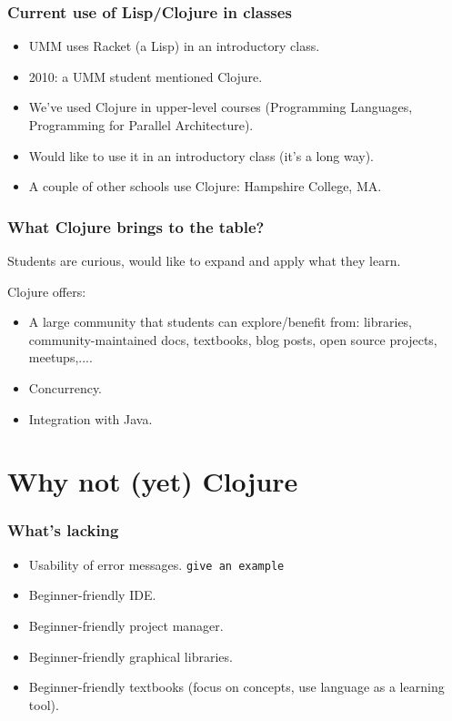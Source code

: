 \documentclass{beamer}
\begin{document}
\begin{frame}
   \frametitle{Current use of Lisp/Clojure in classes}
\begin{itemize}
\item UMM uses Racket (a Lisp) in an introductory class. 
\item 2010: a UMM student mentioned Clojure. 
\item We've used Clojure in upper-level courses (Programming Languages, Programming for Parallel Architecture).
\item Would like to use it in an introductory class (it's a long way).
\item A couple of other schools use Clojure: Hampshire College, MA. 
\end{itemize}
\end{frame}

\begin{frame}
   \frametitle{What Clojure brings to the table?}
Students are curious, would like to expand and apply what they learn. 

Clojure offers:
\begin{itemize}
\item A large community that students can explore/benefit from: libraries, community-maintained docs, textbooks, blog posts, open source projects, meetups,....
\item Concurrency.
\item Integration with Java. 
\end{itemize}
\end{frame}

\section{Why {\bf not} (yet) Clojure}

\begin{frame}
   \frametitle{What's lacking}
\begin{itemize}
\item Usability of error messages. {\tt give an example}
\item Beginner-friendly IDE. 
\item Beginner-friendly project manager. 
\item Beginner-friendly graphical libraries. 
\item Beginner-friendly textbooks (focus on concepts, use language as a learning tool). 
\end{itemize}
\end{frame}
\end{document}
